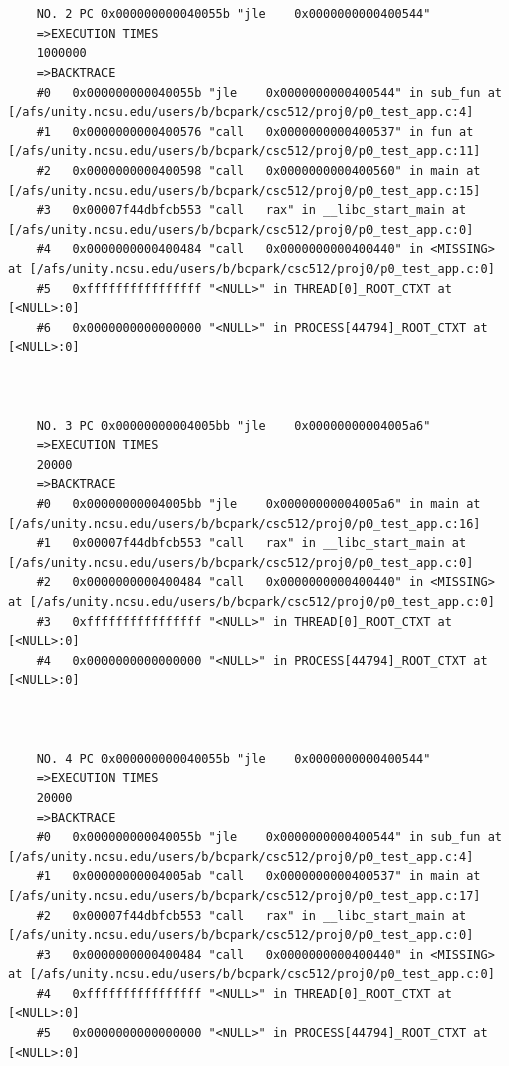 \documentclass[11pt]{article}
\begin{document}
\begin{verbatim}
    
    
    NO. 2 PC 0x000000000040055b "jle    0x0000000000400544"
    =>EXECUTION TIMES
    1000000
    =>BACKTRACE
    #0   0x000000000040055b "jle    0x0000000000400544" in sub_fun at [/afs/unity.ncsu.edu/users/b/bcpark/csc512/proj0/p0_test_app.c:4]
    #1   0x0000000000400576 "call   0x0000000000400537" in fun at [/afs/unity.ncsu.edu/users/b/bcpark/csc512/proj0/p0_test_app.c:11]
    #2   0x0000000000400598 "call   0x0000000000400560" in main at [/afs/unity.ncsu.edu/users/b/bcpark/csc512/proj0/p0_test_app.c:15]
    #3   0x00007f44dbfcb553 "call   rax" in __libc_start_main at [/afs/unity.ncsu.edu/users/b/bcpark/csc512/proj0/p0_test_app.c:0]
    #4   0x0000000000400484 "call   0x0000000000400440" in <MISSING> at [/afs/unity.ncsu.edu/users/b/bcpark/csc512/proj0/p0_test_app.c:0]
    #5   0xffffffffffffffff "<NULL>" in THREAD[0]_ROOT_CTXT at [<NULL>:0]
    #6   0x0000000000000000 "<NULL>" in PROCESS[44794]_ROOT_CTXT at [<NULL>:0]
    
    
    
    NO. 3 PC 0x00000000004005bb "jle    0x00000000004005a6"
    =>EXECUTION TIMES
    20000
    =>BACKTRACE
    #0   0x00000000004005bb "jle    0x00000000004005a6" in main at [/afs/unity.ncsu.edu/users/b/bcpark/csc512/proj0/p0_test_app.c:16]
    #1   0x00007f44dbfcb553 "call   rax" in __libc_start_main at [/afs/unity.ncsu.edu/users/b/bcpark/csc512/proj0/p0_test_app.c:0]
    #2   0x0000000000400484 "call   0x0000000000400440" in <MISSING> at [/afs/unity.ncsu.edu/users/b/bcpark/csc512/proj0/p0_test_app.c:0]
    #3   0xffffffffffffffff "<NULL>" in THREAD[0]_ROOT_CTXT at [<NULL>:0]
    #4   0x0000000000000000 "<NULL>" in PROCESS[44794]_ROOT_CTXT at [<NULL>:0]
    
    
    
    NO. 4 PC 0x000000000040055b "jle    0x0000000000400544"
    =>EXECUTION TIMES
    20000
    =>BACKTRACE
    #0   0x000000000040055b "jle    0x0000000000400544" in sub_fun at [/afs/unity.ncsu.edu/users/b/bcpark/csc512/proj0/p0_test_app.c:4]
    #1   0x00000000004005ab "call   0x0000000000400537" in main at [/afs/unity.ncsu.edu/users/b/bcpark/csc512/proj0/p0_test_app.c:17]
    #2   0x00007f44dbfcb553 "call   rax" in __libc_start_main at [/afs/unity.ncsu.edu/users/b/bcpark/csc512/proj0/p0_test_app.c:0]
    #3   0x0000000000400484 "call   0x0000000000400440" in <MISSING> at [/afs/unity.ncsu.edu/users/b/bcpark/csc512/proj0/p0_test_app.c:0]
    #4   0xffffffffffffffff "<NULL>" in THREAD[0]_ROOT_CTXT at [<NULL>:0]
    #5   0x0000000000000000 "<NULL>" in PROCESS[44794]_ROOT_CTXT at [<NULL>:0]
    

\end{verbatim}
\end{document}
